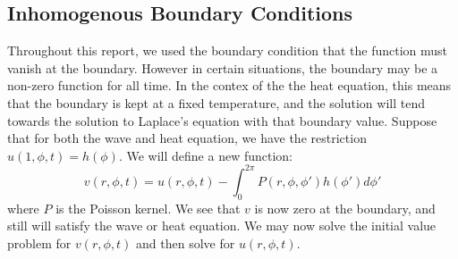 \documentclass{article}
\begin{document}
\begin{appendices}
\section{Inhomogenous Boundary Conditions}
Throughout this report, we used the boundary condition that the function must vanish at the boundary. However in certain situations, the boundary may be a non-zero function for all time. In the contex of the the heat equation, this means that the boundary is kept at a fixed temperature, and the solution will tend towards the solution to Laplace's equation with that boundary value. Suppose that for both the wave and heat equation, we have the restriction $u(1,\phi,t)=h(\phi)$. We will define a new function:
\begin{equation}
  v(r,\phi,t) = u(r,\phi,t) - \int_0^{2\pi} P(r,\phi,\phi')h(\phi')d\phi'
\end{equation}
where $P$ is the Poisson kernel. We see that $v$ is now zero at the boundary, and still will satisfy the wave or heat equation. We may now solve the initial value problem for $v(r,\phi,t)$ and then solve for $u(r,\phi,t)$. 
\end{appendices}
\newpage
\setcounter{secnumdepth}{0}
\end{document}
